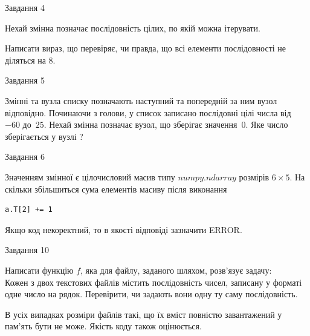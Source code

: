\documentclass[12pt, ukrainian]{article}
\begin{document}
{\begin{minipage}[t]{8.0cm}
\end{minipage}


               
{\begin{center}Завдання {4}\end{center}}
\vspace{-4mm}
Нехай змінна  позначає послідовність цілих, по якій можна ітерувати.

Написати вираз, що перевіряє, чи правда, що всі елементи послідовності не діляться на 8.\par

\vspace{10mm}
               
{\begin{center}Завдання {5}\end{center}}
\vspace{-4mm}
Змінні  та  вузла списку позначають наступний та попередній за ним вузол відповідно. Починаючи з голови, у список записано послідовні цілі числа від~$-60$ до~$25$. Нехай змінна  позначає вузол, що зберігає значення~$0$.
Яке число зберігається у вузлі  ?\par

               
{\begin{center}Завдання {6}\end{center}}
\vspace{-4mm}
Значенням змінної  є цілочисловий масив типу $numpy.ndarray$ розмірів $6{\times}5$. На скільки збільшиться сума елементів масиву  після виконання
\begin{verbatim}
a.T[2] += 1
\end{verbatim}


Якщо код некоректний, то в якості відповіді зазначити ERROR.\par

               
{\begin{center}Завдання {10}\end{center}}
\vspace{-4mm}

Написати функцію $f$, яка для файлу, заданого шляхом, розв’язує задачу:\\ Кожен з двох текстових файлів містить послідовність чисел, записану у форматі одне число на рядок.  Перевірити, чи задають вони одну ту саму послідовність.

В усіх випадках розміри файлів такі, що їх вміст повністю завантажений у пам'ять бути не може. Якість коду також оцінюється.



}
\end{document}
